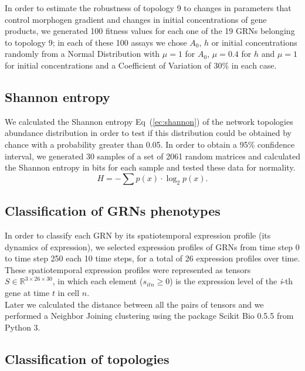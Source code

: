 \documentclass[10pt,letterpaper]{article}
\begin{document}
In order to estimate the robustness of topology 9 to changes in parameters that
control morphogen gradient and changes in initial concentrations of gene
products, we generated 100 fitness values for each one of the 19 GRNs
belonging to topology 9; in each of these 100 assays we chose $A_0$, $h$ or
initial concentrations randomly from a Normal Distribution with $\mu = 1$ for
$A_0$, $\mu = 0.4$ for $h$ and $\mu = 1$ for initial concentrations and a
Coefficient of Variation of 30\% in each case.

\subsection*{Shannon entropy}

We calculated the Shannon entropy Eq~(\ref{ec:shannon}) of the network
topologies abundance distribution in order to test if this distribution could be obtained
by chance with a probability greater than 0.05. In order to obtain a 95\%
confidence interval, we generated 30 samples of a set of 2061 random matrices
and calculated the Shannon entropy in bits for each sample and tested these data
for normality.
\begin{equation}
 H = -\sum p(x) \cdot \log_{2}p(x).
 \label{ec:shannon}
\end{equation}

\subsection*{Classification of GRNs phenotypes}

In order to classify each GRN by its spatiotemporal expression profile (its
dynamics of expression), we selected expression profiles of GRNs from time step
0 to time step 250 each 10 time steps, for a total of 26 expression profiles
over time. These spatiotemporal expression profiles were represented as tensors
$S \in \mathbb{R}^{3 \times 26 \times 30}$, in which each element ($s_{itn} \geq
0$) is the expression level of the \emph{i}-th gene at time $t$ in cell $n$.\\

Later we calculated the distance between all the pairs of tensors and we
performed a Neighbor Joining clustering using the package Scikit Bio 0.5.5 from
Python 3.

\subsection*{Classification of topologies}
\end{document}
